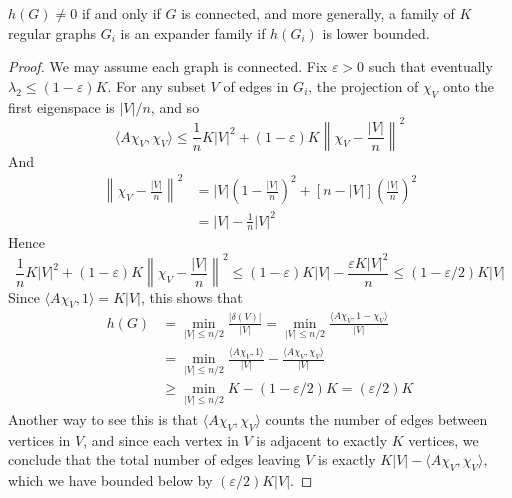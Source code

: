 \begin{prop}
    $h(G) \neq 0$ if and only if $G$ is connected, and more generally, a family of $K$ regular graphs $G_i$ is an expander family if $h(G_i)$ is lower bounded.
\end{prop}
\begin{proof}
    We may assume each graph is connected. Fix $\varepsilon > 0$ such that eventually $\lambda_2 \leq (1 - \varepsilon)K$. For any subset $V$ of edges in $G_i$, the projection of $\chi_V$ onto the first eigenspace is $|V|/n$, and so
    \[ \langle A \chi_V, \chi_V \rangle \leq \frac{1}{n} K|V|^2 + (1 - \varepsilon) K \left\| \chi_V - \frac{|V|}{n} \right\|^2 \]
    And
    \begin{align*}
        \left\| \chi_V - \frac{|V|}{n} \right\|^2 &= |V| \left( 1 - \frac{|V|}{n} \right)^2 + [n - |V|] \left( \frac{|V|}{n} \right)^2\\
        &= |V| - \frac{1}{n}|V|^2
    \end{align*}
    Hence
    \[ \frac{1}{n} K|V|^2 + (1 - \varepsilon) K \left\| \chi_V - \frac{|V|}{n} \right\|^2 \leq (1 - \varepsilon)K|V| - \frac{\varepsilon K |V|^2}{n} \leq (1 - \varepsilon/2) K |V| \]
    Since $\langle A\chi_V, 1 \rangle = K |V|$, this shows that
    \begin{align*}
        h(G) &= \min_{|V| \leq n/2} \frac{|\delta(V)|}{|V|} = \min_{|V| \leq n/2} \frac{\langle A\chi_V, 1 - \chi_V \rangle}{|V|}\\
        &= \min_{|V| \leq n/2} \frac{\langle A\chi_V, 1 \rangle}{|V|} - \frac{\langle A\chi_V, \chi_V \rangle}{|V|}\\
        &\geq \min_{|V| \leq n/2} K - (1 - \varepsilon/2) K = (\varepsilon/2)K
    \end{align*}
    Another way to see this is that $\langle A\chi_V, \chi_V \rangle$ counts the number of edges between vertices in $V$, and since each vertex in $V$ is adjacent to exactly $K$ vertices, we conclude that the total number of edges leaving $V$ is exactly $K|V| - \langle A \chi_V, \chi_V \rangle$, which we have bounded below by $(\varepsilon/2)K|V|$.


\end{proof}
